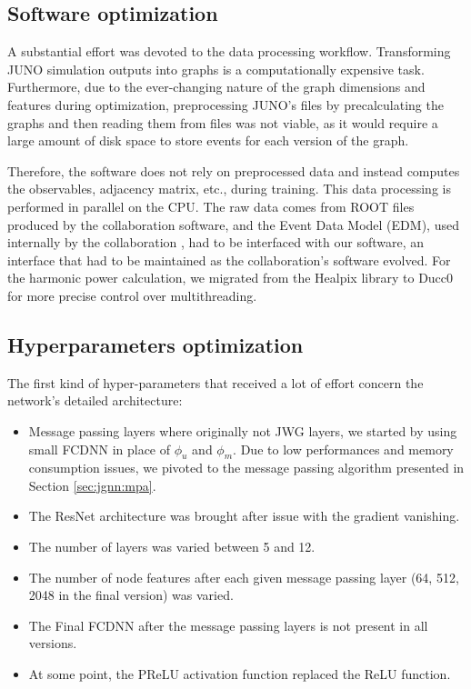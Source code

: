 \documentclass[../main.tex]{subfiles}
\begin{document}
\subsection{Software optimization}


A substantial effort was devoted to the data processing workflow. Transforming JUNO simulation outputs into graphs is a computationally expensive task. Furthermore, due to the ever-changing nature of the graph dimensions and features during optimization, preprocessing JUNO's files by precalculating the graphs and then reading them from files was not viable, as it would require a large amount of disk space to store events for each version of the graph.

Therefore, the software does not rely on preprocessed data and instead computes the observables, adjacency matrix, etc., during training. This data processing is performed in parallel on the CPU. The raw data comes from ROOT files produced by the collaboration software, and the Event Data Model (EDM), used internally by the collaboration \cite{li_design_2017}, had to be interfaced with our software, an interface that had to be maintained as the collaboration's software evolved. For the harmonic power calculation, we migrated from the Healpix library to Ducc0 \cite{reinecke_ducc0_2024} for more precise control over multithreading.

\subsection{Hyperparameters optimization}

The first kind of hyper-parameters that received a lot of effort concern the network's detailed architecture:
\begin{itemize}
  \item Message passing layers where originally not JWG layers, we started by using small FCDNN in place of $\phi_u$ and $\phi_m$. Due to low performances and memory consumption issues, we pivoted to the message passing algorithm presented in Section \ref{sec:jgnn:mpa}.

  \item The ResNet architecture was brought after issue with the gradient vanishing.

  \item The number of layers was varied between 5 and 12.

  \item The number of node features after each given message passing layer (64, 512, 2048 in the final version) was varied.

  \item The Final FCDNN after the message passing layers is not present in all versions.

  \item At some point, the PReLU activation function replaced the ReLU function.
\end{itemize}
\end{document}
